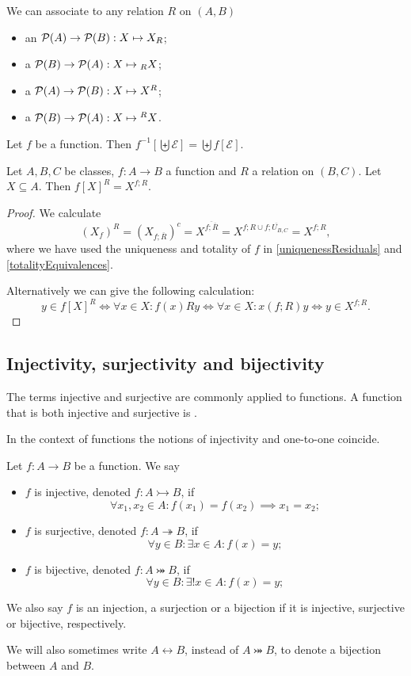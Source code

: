 We can associate to any relation $R$ on $(A,B)$
\begin{itemize}
\item an  $\operatorname{\mathcal{P}}(A) \to \operatorname{\mathcal{P}}(B): X \mapsto X_R$;
\item a  $\operatorname{\mathcal{P}}(B) \to \operatorname{\mathcal{P}}(A): X \mapsto {_RX}$;
\item a  $\operatorname{\mathcal{P}}(A) \to \operatorname{\mathcal{P}}(B): X \mapsto X^R$;
\item a  $\operatorname{\mathcal{P}}(B) \to \operatorname{\mathcal{P}}(A): X \mapsto {^RX}$.
\end{itemize}

\begin{lemma}
Let $f$ be a function. Then $f^{-1}[\biguplus \mathcal{E}] = \biguplus f[\mathcal{E}]$.
\end{lemma}

\begin{lemma} \label{functionUpperbound}
Let $A,B,C$ be classes, $f: A\to B$ a function and $R$ a relation on $(B,C)$. Let $X \subseteq A$. Then $f[X]^R = X^{f;R}$.
\end{lemma}
\begin{proof}
We calculate
\[ (X_f)^{R} = (X_{f;\overline{R}})^c = X^{\overline{f;\overline{R}}} = X^{f;R \cup \overline{f;U_{B,C}}} = X^{f;R}, \]
where we have used the uniqueness and totality of $f$ in \ref{uniquenessResiduals} and \ref{totalityEquivalences}.

Alternatively we can give the following calculation:
\[ y\in f[X]^R \iff \forall x\in X: f(x)Ry \iff \forall x\in X: x(f;R)y \iff y\in X^{f;R}. \]
\end{proof}

\subsection{Injectivity, surjectivity and bijectivity}
\begin{definition}
The terms injective and surjective are commonly applied to functions. A function that is both injective and surjective is .
\end{definition}
In the context of functions the notions of injectivity and one-to-one coincide.
\begin{lemma}
Let $f:A\to B$ be a function. We say
\begin{itemize}
\item $f$ is injective, denoted $f: A\rightarrowtail B$, if
\[ \forall x_1,x_2\in A: f(x_1) = f(x_2) \implies x_1 = x_2; \]
\item $f$ is surjective, denoted $f: A\twoheadrightarrow B$, if
\[ \forall y\in B: \exists x\in A: f(x) = y; \]
\item $f$ is bijective, denoted $f: A\twoheadrightarrowtail B$, if
\[ \forall y\in B: \exists! x\in A: f(x) = y; \]
\end{itemize}
We also say $f$ is an injection, a surjection or a bijection if it is injective, surjective or bijective, respectively.

We will also sometimes write $A \leftrightarrow B$, instead of $A\twoheadrightarrowtail B$, to denote a bijection between $A$ and $B$.
\end{lemma}

